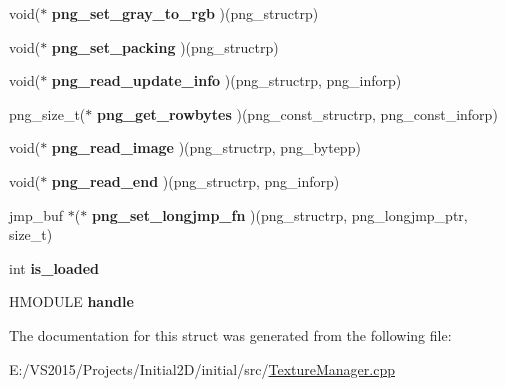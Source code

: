 \begin{DoxyCompactItemize}
\mbox{\label{structlibpng__func__group_a1bb07f97d0aa45bb788bfee6ef793d3d}} 
void($\ast$ {\bfseries png\+\_\+set\+\_\+gray\+\_\+to\+\_\+rgb} )(png\+\_\+structrp)
\item 
\mbox{\label{structlibpng__func__group_aeb294f92b613655e54e9806948fe6e5f}} 
void($\ast$ {\bfseries png\+\_\+set\+\_\+packing} )(png\+\_\+structrp)
\item 
\mbox{\label{structlibpng__func__group_acbc14fc2686cdb39b020ad653c9a9491}} 
void($\ast$ {\bfseries png\+\_\+read\+\_\+update\+\_\+info} )(png\+\_\+structrp, png\+\_\+inforp)
\item 
\mbox{\label{structlibpng__func__group_a15b6c19df79bd604b5a479ce95c76ee5}} 
png\+\_\+size\+\_\+t($\ast$ {\bfseries png\+\_\+get\+\_\+rowbytes} )(png\+\_\+const\+\_\+structrp, png\+\_\+const\+\_\+inforp)
\item 
\mbox{\label{structlibpng__func__group_aece4144ba32544fa59cb31ccb652d58a}} 
void($\ast$ {\bfseries png\+\_\+read\+\_\+image} )(png\+\_\+structrp, png\+\_\+bytepp)
\item 
\mbox{\label{structlibpng__func__group_af45b25f25453c8bf389f0ca3a7eab455}} 
void($\ast$ {\bfseries png\+\_\+read\+\_\+end} )(png\+\_\+structrp, png\+\_\+inforp)
\item 
\mbox{\label{structlibpng__func__group_a869a25830558fb8c42fb50700c6bc681}} 
jmp\+\_\+buf $\ast$($\ast$ {\bfseries png\+\_\+set\+\_\+longjmp\+\_\+fn} )(png\+\_\+structrp, png\+\_\+longjmp\+\_\+ptr, size\+\_\+t)
\item 
\mbox{\label{structlibpng__func__group_a492bcce13be9c565c004dbf0454551a4}} 
int {\bfseries is\+\_\+loaded}
\item 
\mbox{\label{structlibpng__func__group_a570bb142fef08e1ab9f52a199e71e61c}} 
H\+M\+O\+D\+U\+LE {\bfseries handle}
\end{DoxyCompactItemize}


The documentation for this struct was generated from the following file\+:\begin{DoxyCompactItemize}
\item 
E\+:/\+V\+S2015/\+Projects/\+Initial2\+D/initial/src/\mbox{\hyperlink{_texture_manager_8cpp}{Texture\+Manager.\+cpp}}\end{DoxyCompactItemize}
